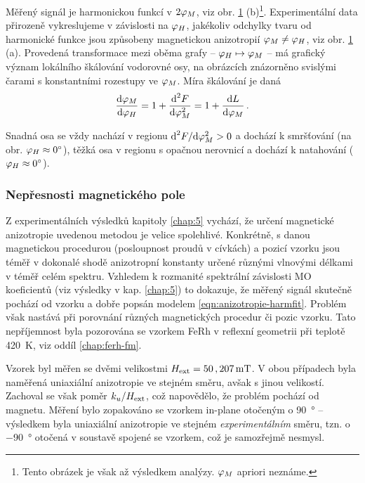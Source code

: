 Měřený signál je harmonickou funkcí v $2\varphi_M$, viz obr. \ref{fig:anizotropie-vizualni} (b)\footnote{Tento obrázek je však až výsledkem analýzy. $\varphi_M$ apriori neznáme.}.
Experimentální data přirozeně vykreslujeme v závislosti na $\varphi_H$, jakékoliv odchylky tvaru od harmonické funkce jsou způsobeny magnetickou anizotropií $\varphi_M\neq\varphi_H$, viz obr. \ref{fig:anizotropie-vizualni} (a).
Provedená transformace mezi oběma grafy -- $\varphi_H \mapsto \varphi_M$ -- má grafický význam lokálního škálování vodorovné osy, na obrázcích znázorněno svislými čarami s konstantními rozestupy ve $\varphi_M$.
Míra škálování je daná
\begin{equation}
    \frac{\textrm{d}\varphi_M}{\textrm{d}\varphi_H} = 1 +\frac{\textrm{d}^2 F}{\textrm{d}\varphi_M^2} = 1 + \frac{\textrm{d}L}{\textrm{d}\varphi_M} \,.
\end{equation}

Snadná osa se vždy nachází v regionu $\textrm{d}^2F/\textrm{d}\varphi_M^2 > 0$ a dochází k smršťování (na obr. $\varphi_H\approx\SI{0}{\degree}$), těžká osa v regionu s opačnou nerovnicí a dochází k natahování ($\varphi_H\approx\SI{0}{\degree}$).

\begin{figure}[htbp]
    \centering
    \caption{}
    \label{fig:anizotropie-vizualni}
\end{figure}


\subsubsection{Nepřesnosti magnetického pole}

Z experimentálních výsledků kapitoly \ref{chap:5} vychází, že určení magnetické anizotropie uvedenou metodou je velice spolehlivé.
Konkrétně, s danou magnetickou procedurou (posloupnost proudů v cívkách) a pozicí vzorku jsou téměř v dokonalé shodě anizotropní konstanty určené různými vlnovými délkami v téměř celém spektru.
Vzhledem k rozmanité spektrální závislosti MO koeficientů (viz výsledky v kap. \ref{chap:5}) to dokazuje, že měřený signál skutečně pochází od vzorku a dobře popsán modelem \eqref{eqn:anizotropie-harmfit}.
Problém však nastává při porovnání různých magnetických procedur či pozic vzorku.
Tato nepříjemnost byla pozorována se vzorkem FeRh v reflexní geometrii při teplotě \SI{420}{\kelvin}, viz oddíl \ref{chap:ferh-fm}.

Vzorek byl měřen se dvěmi velikostmi $H_\textrm{ext} = 50\,,\SI{207}{\milli\tesla}$.
V obou případech byla naměřená uniaxiální anizotropie ve stejném směru, avšak s jinou velikostí.
Zachoval se však poměr $k_u/H_\textrm{ext}$, což napovědělo, že problém pochází od magnetu.
Měření bylo zopakováno se vzorkem in-plane otočeným o \SI{90}{\degree} -- výsledkem byla uniaxiální anizotropie ve stejném \emph{experimentálním} směru, tzn. o \SI{-90}{\degree} otočená v soustavě spojené se vzorkem, což je samozřejmě nesmysl.

